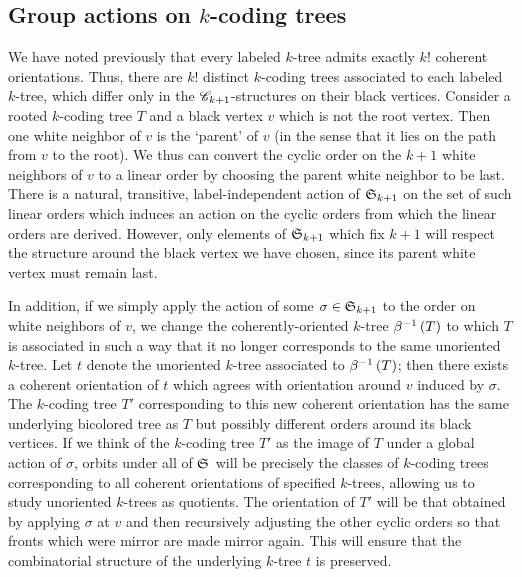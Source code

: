 \documentclass[distribution,draft]{brandiss} %
\numberwithin{section}{chapter}
\numberwithin{figure}{chapter}
\begin{document}
\subsection{Group actions on $k$-coding trees}\label{ss:actct}

We have noted previously that every labeled $k$-tree admits exactly $k!$ coherent orientations.
Thus, there are $k!$ distinct $k$-coding trees associated to each labeled $k$-tree, which differ only in the $\mathscr{C}_{k+1}$-structures on their black vertices.
Consider a rooted $k$-coding tree $T$ and a black vertex $v$ which is not the root vertex.
Then one white neighbor of $v$ is the `parent' of $v$ (in the sense that it lies on the path from $v$ to the root).
We thus can convert the cyclic order on the $k+1$ white neighbors of $v$ to a linear order by choosing the parent white neighbor to be last.
There is a natural, transitive, label-independent action of $ \mathfrak{S}_{k+1} $ on the set of such linear orders which induces an action on the cyclic orders from which the linear orders are derived.
However, only elements of $ \mathfrak{S}_{k+1} $ which fix $k+1$ will respect the structure around the black vertex we have chosen, since its parent white vertex must remain last.

In addition, if we simply apply the action of some $\sigma \in  \mathfrak{S}_{k+1} $ to the order on white neighbors of $v$, we change the coherently-oriented $k$-tree $\beta^{-1} \left( {T} \right)$ to which $T$ is associated in such a way that it no longer corresponds to the same unoriented $k$-tree.
Let $t$ denote the unoriented $k$-tree associated to $\beta^{-1} \left( {T} \right)$; then there exists a coherent orientation of $t$ which agrees with orientation around $v$ induced by $\sigma$.
The $k$-coding tree $T'$ corresponding to this new coherent orientation has the same underlying bicolored tree as $T$ but possibly different orders around its black vertices.
If we think of the $k$-coding tree $T'$ as the image of $T$ under a global action of $\sigma$, orbits under all of $ \mathfrak{S}_{} $ will be precisely the classes of $k$-coding trees corresponding to all coherent orientations of specified $k$-trees, allowing us to study unoriented $k$-trees as quotients.
The orientation of $T'$ will be that obtained by applying $\sigma$ at $v$ and then recursively adjusting the other cyclic orders so that fronts which were mirror are made mirror again.
This will ensure that the combinatorial structure of the underlying $k$-tree $t$ is preserved.
\end{document}

